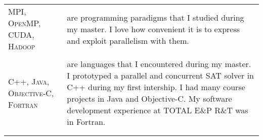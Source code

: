 \begin{tabular}{p{2cm}|p{11cm}}

\textsc{MPI, OpenMP, CUDA, Hadoop} & are programming paradigms that I studied during my master. I love how convenient it is to express and exploit parallelism with them.\\
\multicolumn{2}{c}{} \\

\textsc{C++, \newline Java, Objective-C, Fortran} & are languages that I encountered during my master.
I prototyped a parallel and concurrent SAT solver in C++ during my first intership.
I had many course projects in Java and Objective-C.
My software development experience at \textsc{TOTAL E\&P R\&T} was in Fortran.\\
\multicolumn{2}{c}{} \\

\multicolumn{2}{c}{} \\

\end{tabular}
